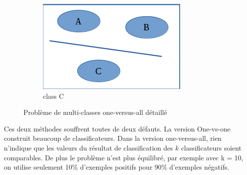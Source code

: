 \begin{figure}[H]
\begin{subfigure}[b]{0.30\textwidth}
                \includegraphics[width=\textwidth]{images/classc}
                \caption{class C}
                \label{classc}
        \end{subfigure}
        \caption{Problème de multi-classes one-versus-all détaillé}\label{1vsalldetail}
\end{figure}

Ces deux méthodes souffrent toutes de deux défauts. La version One-vs-one construit beaucoup de classificateurs. Dans la version one-versus-all, rien n'indique que les valeurs du résultat de classification des $k$ classificateurs soient comparables. De plus le problème n'est plus équilibré, par exemple avec k = 10, on utilise seulement 10\% d'exemples positifs pour 90\% d'exemples négatifs.